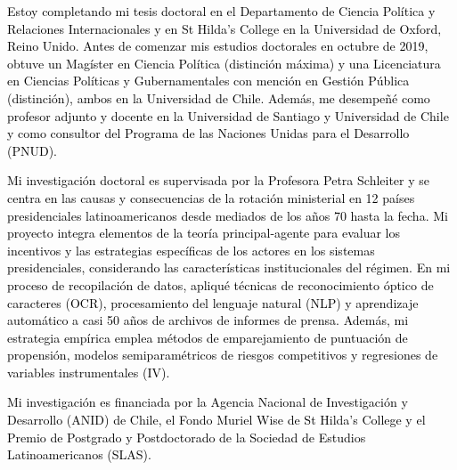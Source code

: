 




\vspace{3mm}

\begin{cvparagraph}

\textcolor{black}{Estoy completando mi tesis doctoral en el Departamento de Ciencia Política y Relaciones Internacionales y en St Hilda’s College en la Universidad de Oxford, Reino Unido.  Antes de comenzar mis estudios doctorales en octubre de 2019, obtuve un Magíster en Ciencia Política (distinción máxima) y una Licenciatura en Ciencias Políticas y Gubernamentales con mención en Gestión Pública (distinción), ambos en la Universidad de Chile. Además, me desempeñé como profesor adjunto y docente en la Universidad de Santiago y Universidad de Chile y como consultor del Programa de las Naciones Unidas para el Desarrollo (PNUD).}

\textcolor{black}{Mi investigación doctoral es supervisada por la Profesora Petra Schleiter y se centra en las causas y consecuencias de la rotación ministerial en 12 países presidenciales latinoamericanos desde mediados de los años 70 hasta la fecha. Mi proyecto integra elementos de la teoría principal-agente para evaluar los incentivos y las estrategias específicas de los actores en los sistemas presidenciales, considerando las características institucionales del régimen. En mi proceso de recopilación de datos, apliqué técnicas de reconocimiento óptico de caracteres (OCR), procesamiento del lenguaje natural (NLP) y aprendizaje automático a casi 50 años de archivos de informes de prensa. Además, mi estrategia empírica emplea métodos de emparejamiento de puntuación de propensión, modelos semiparamétricos de riesgos competitivos y regresiones de variables instrumentales (IV).}

\textcolor{black}{Mi investigación es financiada por la Agencia Nacional de Investigación y Desarrollo (ANID) de Chile, el Fondo Muriel Wise de St Hilda's College y el Premio de Postgrado y Postdoctorado de la Sociedad de Estudios Latinoamericanos (SLAS).}
\vspace{1mm}
\end{cvparagraph}